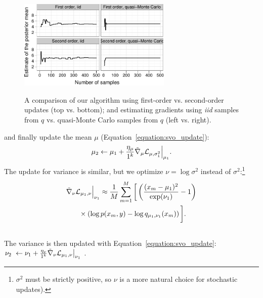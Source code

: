 \begin{figure}[t]
  \center
  \vspace{-10pt}
  \includegraphics[width=0.65\textwidth]{chapter_stochastic_variational_optimization/figures/mean_estimate_by_order_sampling.pdf} \\
  \vspace{-10pt}
  \caption{A comparison of our algorithm using first-order
  vs. second-order updates (top vs. bottom); and estimating gradients
  using \emph{iid} samples from $q$ vs. quasi-Monte Carlo samples from
  $q$ (left vs. right).}
  \label{figure:comparision_order_sampling}
  \vspace{-15pt}
\end{figure}
and finally update the mean $\mu$ (Equation~\ref{equation:svo_update}):
\begin{align}
  \label{equation:gaussian_mean}
  \mu_2 \gets \mu_{1}
    + \frac{\eta_\mu}{1^k}
    {\tilde \nabla_{ \mu}{  \mathcal{L}_{\mu, \sigma_1^2} }} \Bigr|_{\mu_{1}}.
\end{align}
The update for variance is similar, but we optimize $\nu = \log
\sigma^2$ instead of $\sigma^2$:\footnote{$\sigma^2$ must be strictly
positive, so $\nu$ is a more natural choice for stochastic updates).}
\begin{align}
  \label{equation:gaussian_variance_gradient}
  \partlapprox{ \mathcal{L}_{\mu_1, \nu} }{\nu} \Bigr|_{\nu_{1}} & \approx
  \frac{1}{M} \sum_{m=1}^M \bigg[ \left( \frac{ (x_{m} - \mu_{1})^2 }{ \exp(\nu_{1}) } - 1 \right) \\ \nonumber
  & \hspace{-30pt} \times \left( \log p(x_m, y) - \log q_{\mu_1, \nu_1}(x_m) \right) \bigg]. \\ \nonumber
\end{align}
The variance is then updated with Equation~\ref{equation:svo_update}:
$ \nu_2~\gets \nu_{1} + \frac{\eta_\nu}{1^k} {\tilde \nabla_{ \nu}{  \mathcal{L}_{\mu_1, \nu} }} \bigr|_{\nu_{1}}$ .


